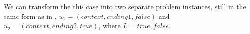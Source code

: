We can transform the this case into two separate 
problem instances, still
in the same form as in , 
$u_1=(context, ending1, false)$ and $u_2=(context, ending2, true)$, where $L = {true, false}$.

 

